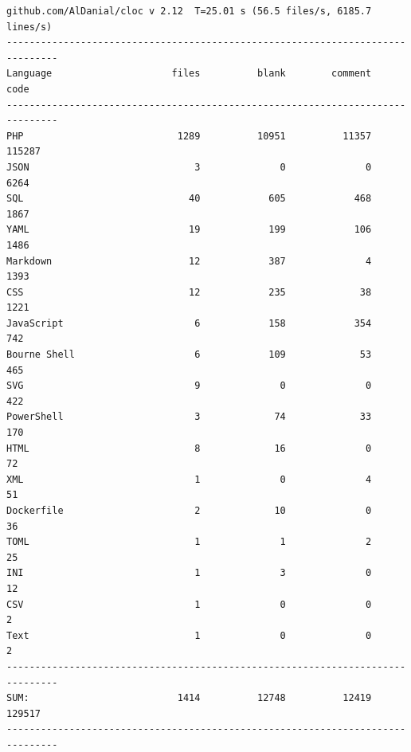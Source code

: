 \begingroup\footnotesize
\begin{verbatim}
github.com/AlDanial/cloc v 2.12  T=25.01 s (56.5 files/s, 6185.7 lines/s)
-------------------------------------------------------------------------------
Language                     files          blank        comment           code
-------------------------------------------------------------------------------
PHP                           1289          10951          11357         115287
JSON                             3              0              0           6264
SQL                             40            605            468           1867
YAML                            19            199            106           1486
Markdown                        12            387              4           1393
CSS                             12            235             38           1221
JavaScript                       6            158            354            742
Bourne Shell                     6            109             53            465
SVG                              9              0              0            422
PowerShell                       3             74             33            170
HTML                             8             16              0             72
XML                              1              0              4             51
Dockerfile                       2             10              0             36
TOML                             1              1              2             25
INI                              1              3              0             12
CSV                              1              0              0              2
Text                             1              0              0              2
-------------------------------------------------------------------------------
SUM:                          1414          12748          12419         129517
-------------------------------------------------------------------------------
\end{verbatim}
\endgroup

